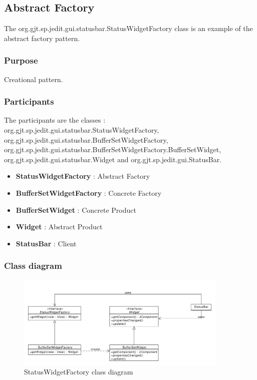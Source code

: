 \documentclass[a4paper,10pt]{article}
\begin{document}
\subsection{Abstract Factory}%
The org.gjt.sp.jedit.gui.statusbar.StatusWidgetFactory class is an example of the abstract factory pattern.

\subsubsection{Purpose}
Creational pattern.
\subsubsection[Participants]{Participants\footnotemark[1]}
The participants are the classes : org.gjt.sp.jedit.gui.statusbar.StatusWidgetFactory, org.gjt.sp.jedit.gui.statusbar.BufferSetWidgetFactory, org.gjt.sp.jedit.gui.statusbar.BufferSetWidgetFactory.BufferSetWidget, org.gjt.sp.jedit.gui.statusbar.Widget and org.gjt.sp.jedit.gui.StatusBar.

\begin{itemize}
 \item \textbf{StatusWidgetFactory} : Abstract Factory
 \item \textbf{BufferSetWidgetFactory} : Concrete Factory
 \item \textbf{BufferSetWidget} : Concrete Product
 \item \textbf{Widget} : Abstract Product
 \item \textbf{StatusBar} : Client
\end{itemize}

\subsubsection{Class diagram}
\begin{center}
\begin{figure}[h]
  \centerline{\includegraphics[width=0.9\textwidth]{abstractfactory-statuswidgetfactory-class-diagram.pdf}}
  \caption{StatusWidgetFactory class diagram}
\end{figure}
\end{center}
\end{document}
